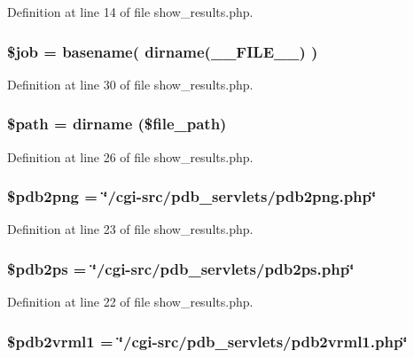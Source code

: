 Definition at line 14 of file show\_\-results.php.
\subsubsection{\setlength{\rightskip}{0pt plus 5cm}\$job = basename( dirname(\_\-\_\-FILE\_\-\_\-) )}\label{show__results_8php_a8}




Definition at line 30 of file show\_\-results.php.
\subsubsection{\setlength{\rightskip}{0pt plus 5cm}\$path = dirname (\$file\_\-path)}\label{show__results_8php_a7}




Definition at line 26 of file show\_\-results.php.
\subsubsection{\setlength{\rightskip}{0pt plus 5cm}\$pdb2png = \char`\"{}/cgi-src/pdb\_\-servlets/pdb2png.php\char`\"{}}\label{show__results_8php_a5}




Definition at line 23 of file show\_\-results.php.
\subsubsection{\setlength{\rightskip}{0pt plus 5cm}\$pdb2ps = \char`\"{}/cgi-src/pdb\_\-servlets/pdb2ps.php\char`\"{}}\label{show__results_8php_a4}




Definition at line 22 of file show\_\-results.php.
\subsubsection{\setlength{\rightskip}{0pt plus 5cm}\$pdb2vrml1 = \char`\"{}/cgi-src/pdb\_\-servlets/pdb2vrml1.php\char`\"{}}\label{show__results_8php_a2}


